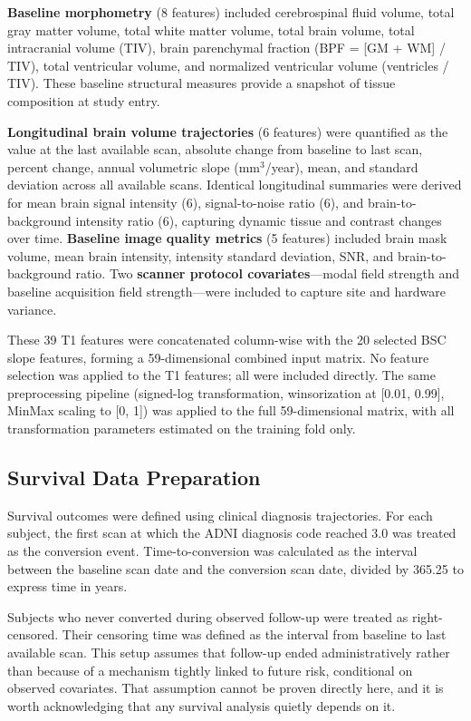 \documentclass[blue]{ludusofficial}
\begin{document}
\textbf{Baseline morphometry} (8 features) included cerebrospinal fluid volume, total gray matter volume, total white matter volume, total brain volume, total intracranial volume (TIV), brain parenchymal fraction (BPF = [GM + WM] / TIV), total ventricular volume, and normalized ventricular volume (ventricles / TIV). These baseline structural measures provide a snapshot of tissue composition at study entry.

\textbf{Longitudinal brain volume trajectories} (6 features) were quantified as the value at the last available scan, absolute change from baseline to last scan, percent change, annual volumetric slope (mm$^3$/year), mean, and standard deviation across all available scans. Identical longitudinal summaries were derived for mean brain signal intensity (6), signal-to-noise ratio (6), and brain-to-background intensity ratio (6), capturing dynamic tissue and contrast changes over time. \textbf{Baseline image quality metrics} (5 features) included brain mask volume, mean brain intensity, intensity standard deviation, SNR, and brain-to-background ratio. Two \textbf{scanner protocol covariates}---modal field strength and baseline acquisition field strength---were included to capture site and hardware variance.

These 39 T1 features were concatenated column-wise with the 20 selected BSC slope features, forming a 59-dimensional combined input matrix. No feature selection was applied to the T1 features; all were included directly. The same preprocessing pipeline (signed-log transformation, winsorization at [0.01, 0.99], MinMax scaling to [0, 1]) was applied to the full 59-dimensional matrix, with all transformation parameters estimated on the training fold only.

\subsection{Survival Data Preparation}

Survival outcomes were defined using clinical diagnosis trajectories. For each subject, the first scan at which the ADNI diagnosis code reached 3.0 was treated as the conversion event. Time-to-conversion was calculated as the interval between the baseline scan date and the conversion scan date, divided by 365.25 to express time in years.

Subjects who never converted during observed follow-up were treated as right-censored. Their censoring time was defined as the interval from baseline to last available scan. This setup assumes that follow-up ended administratively rather than because of a mechanism tightly linked to future risk, conditional on observed covariates. That assumption cannot be proven directly here, and it is worth acknowledging that any survival analysis quietly depends on it.
\end{document}

